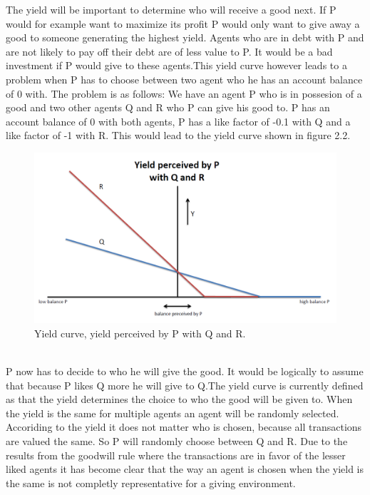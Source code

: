 \documentclass[twoside,openright]{uva-bachelor-thesis}
\begin{document}
The yield will be important to determine who will receive a good next. If P would for example want to maximize its profit P would only want to give away a good to someone generating the highest yield. Agents who are in debt with P and are not likely to pay off their debt are of less value to P. It would be a bad investment if P would give to these agents.This yield curve however leads to a problem when P has to choose between two agent who he has an account balance of 0 with. The problem is as follows: We have an agent P who is in possesion of a good and two other agents Q and R who P can give his good to. P has an account balance of 0 with both agents, P has a like factor of -0.1 with Q and a like factor of -1 with R. This would lead to the yield curve shown in figure 2.2. \\
\begin{figure}[h!]
    \centering
    \includegraphics[scale=0.4]{YieldCurves/yieldcurve_P_QR}
\caption{Yield curve, yield perceived by P with Q and R.}
\end{figure}
\\
P now has to decide to who he will give the good. It would be logically to assume that because P likes Q more he will give to Q.The yield curve is currently defined as that the yield determines the choice to who the good will be given to. When the yield is the same for multiple agents an agent will be randomly selected. Accoriding to the yield it does not matter who is chosen, because all transactions are valued the same. So P will randomly choose between Q and R. Due to the results from the goodwill rule where the transactions are in favor of the lesser liked agents it has become clear that the way an agent is chosen when the yield is the same is not completly representative for a giving environment.
\end{document}
